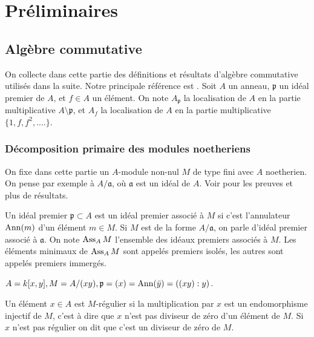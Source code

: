 \chapter{Préliminaires}

\section{Algèbre commutative}

On collecte dans cette partie des définitions et résultats d'algèbre commutative utilisés dans la suite. Notre principale référence est \cite{Matsumura}. Soit $A$ un anneau, $\mathfrak{p}$ un idéal premier de $A$, et $f\in A$ un élément. On note $A_\mathfrak{p}$ la localisation de $A$ en la partie multiplicative $A\setminus \mathfrak{p}$, et $A_f$ la localisation de $A$ en la partie multiplicative $\lbrace 1, f, f^2, ....\rbrace$.


\subsection{Décomposition primaire des modules noetheriens}

On fixe dans cette partie un $A$-module non-nul $M$ de type fini avec $A$ noetherien. On pense par exemple à $A/\mathfrak{a}$, où $\mathfrak{a}$ est un idéal de $A$. Voir \cite[Chap. 6]{Matsumura} pour les preuves et plus de résultats.

\begin{defn}
Un idéal premier $\mathfrak{p}\subset A$ est un idéal premier associé à $M$ si c'est l'annulateur $\operatorname{Ann}(m)$ d'un élément $m\in M$. Si $M$ est de la forme $A/\mathfrak{a}$, on parle d'idéal premier associé à $\mathfrak{a}$. On note $\operatorname{Ass}_AM$ l'ensemble des idéaux premiers associés à $M$. Les éléments minimaux de $\operatorname{Ass}_AM$ sont appelés premiers isolés, les autres sont appelés premiers immergés.
\end{defn}

\begin{ex}
$A=k[x,y], M=A/(xy),\mathfrak{p}=(x)=\operatorname{Ann}(\bar{y})=((xy):y)$.
\end{ex}

\begin{defn}
Un élément $x\in A$ est $M$-régulier si la multiplication par $x$ est un endomorphisme injectif de $M$, c'est à dire que $x$ n'est pas diviseur de zéro d'un élément de $M$. Si $x$ n'est pas régulier on dit que c'est un diviseur de zéro de $M$.
\end{defn}

